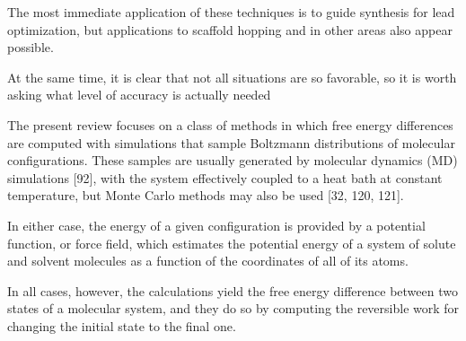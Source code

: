 The most immediate application of these techniques is to guide synthesis for lead optimization, but applications to scaffold
hopping and in other areas also appear possible.

At the same time, it is clear that not all situations are
so favorable, so it is worth asking what level of accuracy
is actually needed

The present review focuses on a class of methods in
which free energy differences are computed with simulations that sample Boltzmann distributions of molecular configurations. These samples are usually generated by molecular dynamics (MD) simulations [92], with
the system effectively coupled to a heat bath at constant temperature, but Monte Carlo methods may also
be used [32, 120, 121]. 

In either case, the energy of a
given configuration is provided by a potential function,
or force field, which estimates the potential energy of
a system of solute and solvent molecules as a function
of the coordinates of all of its atoms.

In
all cases, however, the calculations yield the free energy
difference between two states of a molecular system, and
they do so by computing the reversible work for changing
the initial state to the final one. 